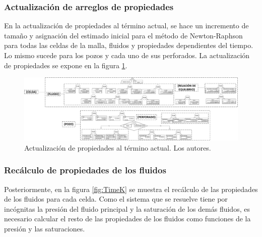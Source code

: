 \subsubsection{Actualización de arreglos de propiedades}\label{subsec:PS_DefVars}
En la actualización de propiedades al término actual, se hace un incremento de tamaño y asignación del estimado inicial para el método de Newton-Raphson para todas las celdas de la malla, fluidos y propiedades dependientes del tiempo. Lo mismo sucede para los pozos y cada uno de sus perforados. La actualización de propiedades se expone en la figura \ref{fig:UpdateProperties}. 

\begin{figure}[h]
	\centering%
	\includegraphics[width=\linewidth]{Fig/ActualizacionDeVariables.pdf}%
	\caption[Actualización de propiedades al término actual.]{Actualización de propiedades al término actual. Los autores.} \label{fig:UpdateProperties}
\end{figure}


\subsubsection{Recálculo de propiedades de los fluidos}\label{subsec:PS_TimeK}
Posteriormente, en la figura \ref{fig:TimeK} se muestra el recálculo de las propiedades de los fluidos para cada celda. Como el sistema que se resuelve tiene por incógnitas la presión del fluido principal y la saturación de los demás fluidos, es necesario calcular el resto de las propiedades de los fluidos como funciones de la presión y las saturaciones. \\%

